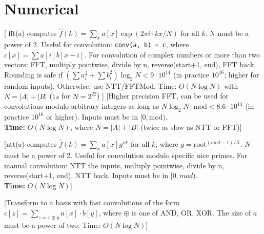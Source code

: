 \chapter{Numerical}

[
   fft(a) computes $\hat f(k) = \sum_x a[x] \exp(2\pi i \cdot k x / N)$ for all $k$. N must be a power of 2.
   Useful for convolution:
   \texttt{conv(a, b) = c}, where $c[x] = \sum a[i]b[x-i]$.
   For convolution of complex numbers or more than two vectors: FFT, multiply
   pointwise, divide by n, reverse(start+1, end), FFT back.
   Rounding is safe if $(\sum a_i^2 + \sum b_i^2)\log_2{N} < 9\cdot10^{14}$
   (in practice $10^{16}$; higher for random inputs).
   Otherwise, use NTT/FFTMod.
   Time: $O(N \log N)$ with $N = |A|+|B|$ ($\tilde 1s$ for $N=2^{22}$)
]
%
[Higher precision FFT, can be used for convolutions modulo arbitrary integers as long as $N\log_2N\cdot \text{mod} < 8.6 \cdot 10^{14}$ (in practice $10^{16}$ or higher). Inputs must be in {$[0, \text{mod})$}. \\
\textbf{Time:} {$O(N \log N)$}, where $N = |A|+|B|$ (twice as slow as NTT or FFT)]

%
[ntt(a) computes $\hat f(k) = \sum_x a[x] g^{xk}$ for all $k$, where $g=\text{root}^{(mod-1)/N}$. $N$ must be a power of 2. Useful for convolution modulo specific nice primes. For manual convolution: NTT the inputs, multiply pointwise, divide by n, reverse(start+1, end), NTT back. Inputs must be in {$[0, mod)$}. \\
\textbf{Time:} $O(N \log N)$]

[Transform to a basis with fast convolutions of the form
 $\displaystyle c[z] = \sum\nolimits_{z = x \oplus y} a[x] \cdot b[y]$,
 where $\oplus$ is one of AND, OR, XOR. The size of $a$ must be a power of two.
 Time: $O(N \log N)$]